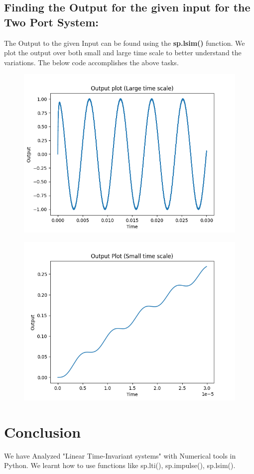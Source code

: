 \documentclass[12pt, a4paper]{report}
\begin{document}
\subsection{Finding the Output for the given input for the Two Port System:}
The Output to the given Input can be  found using the \textbf{sp.lsim()} function. We plot the output over both small and large time scale to better understand the variations. The below code accomplishes the above tasks.
\vspace{2mm}
\noindent

\begin{figure}[h!]
    \centering
    \includegraphics[scale=0.75]{fig6.png} 
    \caption{}
    \label{fig:my_label}
\end{figure}
\vspace{10mm}

\begin{figure}[h!]
    \centering
    \includegraphics[scale=0.75]{fig7.png} 
    \caption{}
    \label{fig:my_label}
\end{figure}
\section{Conclusion}
We have Analyzed "Linear Time-Invariant systems" with Numerical tools in Python. We learnt how to use functions like sp.lti(), sp.impulse(), sp.lsim().
\end{document}
